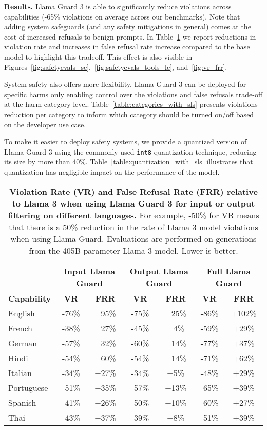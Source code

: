 \textbf{Results.} 
Llama Guard 3 is able to significantly reduce violations across capabilities (-65\% violations on average across our benchmarks). Note that adding system safeguards (and any safety mitigations in general) comes at the cost of increased refusals to benign prompts. In Table~\ref{table:capabilities_with_sls} we report reductions in violation rate and increases in false refusal rate increase compared to the base model to highlight this tradeoff.  This effect is also visible in Figures~\ref{fig:safetyevals_sc},~\ref{fig:safetyevals_tools_lc}, and~\ref{fig:vr_frr}.

System safety also offers more flexibility. Llama Guard 3 can be deployed for specific harms only enabling control over the violations and false refusals trade-off at the harm category level. Table~\ref{table:categories_with_sls} presents violations reduction per category to inform which category should be turned on/off based on the developer use case.

To make it easier to deploy safety systems, we provide a quantized version of Llama Guard 3 using the commonly used \texttt{int8} quantization technique, reducing its size by more than 40\%. Table~\ref{table:quantization_with_sls} illustrates that quantization has negligible impact on the performance of the model.

\begin{table}[t]
\centering
    \begin{tabular}{lcccccc}
    \toprule
    & \multicolumn{2}{c}{\textbf{Input Llama Guard}}  &  \multicolumn{2}{c}{\textbf{Output Llama Guard}} &  \multicolumn{2}{c}{\textbf{Full Llama Guard}}  \\
    \midrule
    \textbf{Capability} & \textbf{VR} & \textbf{FRR} & \textbf{VR} & \textbf{FRR} & \textbf{VR} & \textbf{FRR} \\ 
     \midrule
    English & -76\% & +95\% & -75\% & +25\% & -86\% & +102\% \\
    French & -38\% & +27\% & -45\% & +4\% & -59\% & +29\% \\
    German & -57\% & +32\% & -60\% & +14\% & -77\% & +37\% \\
    Hindi & -54\% & +60\% & -54\% & +14\% & -71\% & +62\% \\
    Italian & -34\% & +27\% & -34\% & +5\% & -48\% & +29\% \\
    Portuguese & -51\% & +35\% & -57\% & +13\% & -65\% & +39\% \\
    Spanish & -41\% & +26\% & -50\% & +10\% & -60\% & +27\% \\
    Thai & -43\% & +37\% & -39\% & +8\% & -51\% & +39\% \\
    \bottomrule
    \end{tabular}
    \caption{\textbf{Violation Rate (VR) and False Refusal Rate (FRR) relative to Llama 3 when using Llama Guard 3 for input or output filtering on different languages.} 
    For example, -50\% for VR means that there is a 50\% reduction in the rate of Llama 3 model violations when using Llama Guard.
    Evaluations are performed on generations from the 405B-parameter Llama 3 model. Lower is better.}
    \label{table:capabilities_with_sls}
\end{table}

